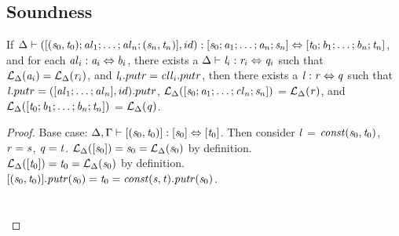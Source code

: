 \subsection{Soundness}

\begin{lemma}
\label{lem:id-clause}
If $\Delta \vdash ([(\mathit{s}_0,\mathit{t}_0);\mathit{al}_1 ; \ldots ; \mathit{al}_n;(\mathit{s}_n,\mathit{t}_n)],id) : [\mathit{s}_0 ; \mathit{a}_1 ; \ldots ; \mathit{a}_n; \mathit{s}_n] \Leftrightarrow [\mathit{t}_0 ; \mathit{b}_1 ; \ldots ; \mathit{b}_n ; \mathit{t}_n]$,
and for each $\mathit{al}_i : \mathit{a}_i \Leftrightarrow \mathit{b}_i$,
there exists a $\Delta \vdash \mathit{l}_i : \mathit{r}_i \Leftrightarrow \mathit{q}_i$ such that
$\mathcal{L}_{\Delta}(\mathit{a}_i)=\mathcal{L}_{\Delta}(\mathit{r}_i)$, and $\mathit{l}_i.putr = \mathit{cll}_i.putr$,
then there exists a $\mathit{l} : \mathit{r} \Leftrightarrow \mathit{q}$ such that $\mathit{l}.putr = ([\mathit{al}_1 ; \ldots ; \mathit{al}_n],id).putr$, $\mathcal{L}_{\Delta}([\mathit{s}_0 ; \mathit{a}_1 ; \ldots ; \mathit{cl}_n ; \mathit{s}_n])$ = $\mathcal{L}_{\Delta}(\mathit{r})$,
and $\mathcal{L}_{\Delta}([\mathit{t}_0 ; \mathit{b}_1 ; \ldots ; \mathit{b}_n ; \mathit{t}_n])$ = $\mathcal{L}_{\Delta}(\mathit{q})$.
\begin{proof}
Base case: $\Delta, \Gamma \vdash [(\mathit{s}_0,\mathit{t}_0)] : [\mathit{s}_0] \Leftrightarrow [\mathit{t}_0]$.
Then consider $\mathit{l}$ = $\mathit{const}(\mathit{s}_0,\mathit{t}_0)$, $\mathit{r} = \mathit{s}$, $\mathit{q} = \mathit{t}$.
$\mathcal{L}_{\Delta}([\mathit{s}_0]) = \mathit{s}_0 = \mathcal{L}_{\Delta}(\mathit{s}_0)$ by definition.\\
$\mathcal{L}_{\Delta}([\mathit{t}_0]) = \mathit{t}_0 = \mathcal{L}_{\Delta}(\mathit{s}_0)$ by definition.\\
$[(\mathit{s}_0,\mathit{t}_0)].\mathit{putr}(\mathit{s}_0)=\mathit{t}_0=\mathit{const}(\mathit{s},\mathit{t}).\mathit{putr}(\mathit{s}_0)$.
\\\\\\


\end{proof}
\end{lemma}
